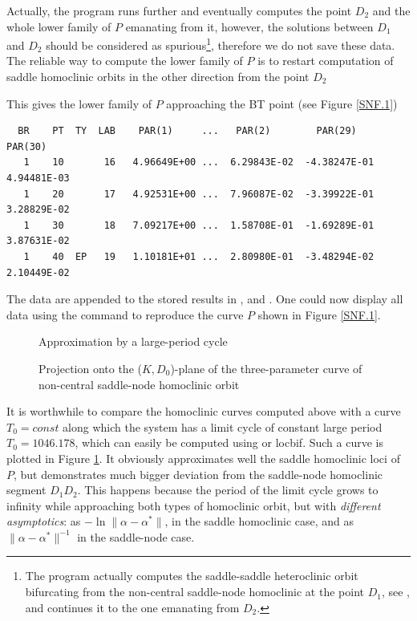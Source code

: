 \documentclass[12pt]{report}
\begin{document}
Actually, the program runs further and
eventually computes the point $D_2$ and the whole lower family of $P$
emanating from it, however, the solutions between $D_1$ and $D_2$
should be considered as spurious\footnote{\label{ft1} The program actually
computes the saddle-saddle heteroclinic orbit bifurcating from the
non-central saddle-node homoclinic at the point $D_1$, see
, and continues it to the one emanating from
$D_2$.}, therefore we do not save these data.
The reliable way to compute the lower family of $P$ is to restart computation
of saddle homoclinic orbits in the other direction from the point $D_2$
\begin{center}
\end{center}
This gives the lower family of $P$ approaching the BT point
(see Figure \ref{SNF.1})
\begin{verbatim}
  BR    PT  TY  LAB    PAR(1)     ...   PAR(2)        PAR(29)       PAR(30)
   1    10       16   4.96649E+00 ...  6.29843E-02  -4.38247E-01   4.94481E-03
   1    20       17   4.92531E+00 ...  7.96087E-02  -3.39922E-01   3.28829E-02
   1    30       18   7.09217E+00 ...  1.58708E-01  -1.69289E-01   3.87631E-02
   1    40  EP   19   1.10181E+01 ...  2.80980E-01  -3.48294E-02   2.10449E-02
\end{verbatim}
The data are appended to the stored results in ,  and
. One could now display all data using the \AUTO
command  to reproduce the curve $P$ shown in Figure
\ref{SNF.1}.
\par
\begin{figure}[p]
\epsfysize 10.0cm
\centerline{}
\caption{Approximation by a large-period cycle}
\label{SNF.2}
\end{figure}
\begin{figure}[p]
\epsfysize 9.0cm
\centerline{}
\caption{Projection onto the ($K,D_0$)-plane of the 
three-parameter curve of non-central  saddle-node homoclinic orbit}
\label{SNF.3}
\end{figure}
%
It is worthwhile to compare the homoclinic curves computed above with
a curve $T_0=const$ along which the system has a limit cycle of constant large
period $T_0=1046.178$, which can easily be computed using \AUTO or
{\cal locbif}. Such a curve is plotted in Figure \ref{SNF.2}. 
It obviously approximates well the saddle homoclinic loci of $P$, but 
demonstrates much bigger
deviation from the saddle-node homoclinic segment $D_1D_2$. This happens
because the period of the limit cycle grows to infinity while approaching both
types of homoclinic orbit, but with {\it different asymptotics}: 
as $-\ln\|\alpha-\alpha^*\|$, in the saddle homoclinic case, and 
as $\|\alpha-\alpha^*\|^{-1}$ in the saddle-node case. 
\end{document}

